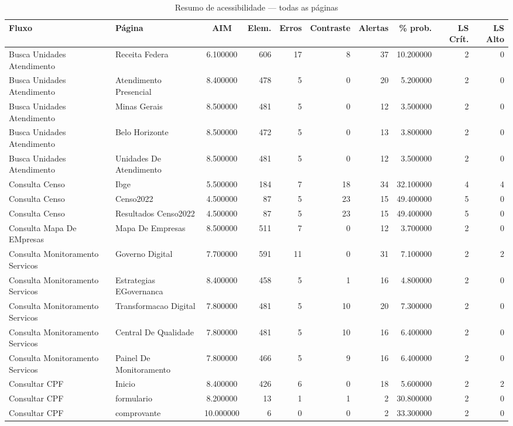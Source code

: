 \begin{table}[htbp]
  \centering
  \caption{Resumo de acessibilidade — todas as páginas}
  \label{tab:summary_all}
  \small
  \begin{tabular}{llcrrrrrr r}
\toprule
Fluxo & Página & AIM & Elem. & Erros & Contraste & Alertas & \% prob. & LS Crít. & LS Alto \\
\midrule
Busca Unidades Atendimento & Receita Federa & 6.100000 & 606 & 17 & 8 & 37 & 10.200000 & 2 & 0 \\
Busca Unidades Atendimento & Atendimento Presencial & 8.400000 & 478 & 5 & 0 & 20 & 5.200000 & 2 & 0 \\
Busca Unidades Atendimento & Minas Gerais & 8.500000 & 481 & 5 & 0 & 12 & 3.500000 & 2 & 0 \\
Busca Unidades Atendimento & Belo Horizonte & 8.500000 & 472 & 5 & 0 & 13 & 3.800000 & 2 & 0 \\
Busca Unidades Atendimento & Unidades De Atendimento & 8.500000 & 481 & 5 & 0 & 12 & 3.500000 & 2 & 0 \\
Consulta Censo & Ibge & 5.500000 & 184 & 7 & 18 & 34 & 32.100000 & 4 & 4 \\
Consulta Censo & Censo2022 & 4.500000 & 87 & 5 & 23 & 15 & 49.400000 & 5 & 0 \\
Consulta Censo & Resultados Censo2022 & 4.500000 & 87 & 5 & 23 & 15 & 49.400000 & 5 & 0 \\
Consulta Mapa De EMpresas & Mapa De Empresas & 8.500000 & 511 & 7 & 0 & 12 & 3.700000 & 2 & 0 \\
Consulta Monitoramento Servicos & Governo Digital & 7.700000 & 591 & 11 & 0 & 31 & 7.100000 & 2 & 2 \\
Consulta Monitoramento Servicos & Estrategias EGovernanca & 8.400000 & 458 & 5 & 1 & 16 & 4.800000 & 2 & 0 \\
Consulta Monitoramento Servicos & Transformacao Digital & 7.800000 & 481 & 5 & 10 & 20 & 7.300000 & 2 & 0 \\
Consulta Monitoramento Servicos & Central De Qualidade & 7.800000 & 481 & 5 & 10 & 16 & 6.400000 & 2 & 0 \\
Consulta Monitoramento Servicos & Painel De Monitoramento & 7.800000 & 466 & 5 & 9 & 16 & 6.400000 & 2 & 0 \\
Consultar CPF & Inicio & 8.400000 & 426 & 6 & 0 & 18 & 5.600000 & 2 & 2 \\
Consultar CPF & formulario & 8.200000 & 13 & 1 & 1 & 2 & 30.800000 & 2 & 0 \\
Consultar CPF & comprovante & 10.000000 & 6 & 0 & 0 & 2 & 33.300000 & 2 & 0 \\
\bottomrule
\end{tabular}
\end{table}
